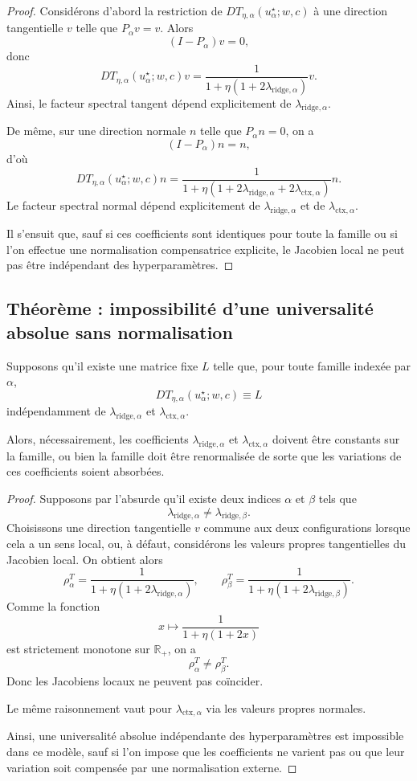 \begin{proof}
Considérons d'abord la restriction de \(DT_{\eta,\alpha}(u_\alpha^\star;w,c)\) à une direction tangentielle \(v\) telle que \(P_\alpha v=v\). Alors
\[
(I-P_\alpha)v=0,
\]
donc
\[
DT_{\eta,\alpha}(u_\alpha^\star;w,c)v
=
\frac{1}{1+\eta(1+2\lambda_{\mathrm{ridge},\alpha})}v.
\]
Ainsi, le facteur spectral tangent dépend explicitement de \(\lambda_{\mathrm{ridge},\alpha}\).

De même, sur une direction normale \(n\) telle que \(P_\alpha n=0\), on a
\[
(I-P_\alpha)n=n,
\]
d'où
\[
DT_{\eta,\alpha}(u_\alpha^\star;w,c)n
=
\frac{1}{1+\eta(1+2\lambda_{\mathrm{ridge},\alpha}+2\lambda_{\mathrm{ctx},\alpha})}n.
\]
Le facteur spectral normal dépend explicitement de \(\lambda_{\mathrm{ridge},\alpha}\) et de \(\lambda_{\mathrm{ctx},\alpha}\).

Il s'ensuit que, sauf si ces coefficients sont identiques pour toute la famille ou si l'on effectue une normalisation compensatrice explicite, le Jacobien local ne peut pas être indépendant des hyperparamètres.
\end{proof}

\subsection{Théorème : impossibilité d'une universalité absolue sans normalisation}

Supposons qu'il existe une matrice fixe \(L\) telle que, pour toute famille indexée par \(\alpha\),
\[
DT_{\eta,\alpha}(u_\alpha^\star;w,c)\equiv L
\]
indépendamment de \(\lambda_{\mathrm{ridge},\alpha}\) et \(\lambda_{\mathrm{ctx},\alpha}\).

Alors, nécessairement, les coefficients \(\lambda_{\mathrm{ridge},\alpha}\) et \(\lambda_{\mathrm{ctx},\alpha}\) doivent être constants sur la famille, ou bien la famille doit être renormalisée de sorte que les variations de ces coefficients soient absorbées.

\begin{proof}
Supposons par l'absurde qu'il existe deux indices \(\alpha\) et \(\beta\) tels que
\[
\lambda_{\mathrm{ridge},\alpha}\neq \lambda_{\mathrm{ridge},\beta}.
\]
Choisissons une direction tangentielle \(v\) commune aux deux configurations lorsque cela a un sens local, ou, à défaut, considérons les valeurs propres tangentielles du Jacobien local. On obtient alors
\[
\rho_{\alpha}^{T}
=
\frac{1}{1+\eta(1+2\lambda_{\mathrm{ridge},\alpha})},
\qquad
\rho_{\beta}^{T}
=
\frac{1}{1+\eta(1+2\lambda_{\mathrm{ridge},\beta})}.
\]
Comme la fonction
\[
x\mapsto \frac{1}{1+\eta(1+2x)}
\]
est strictement monotone sur \(\mathbb R_+\), on a
\[
\rho_{\alpha}^{T}\neq \rho_{\beta}^{T}.
\]
Donc les Jacobiens locaux ne peuvent pas coïncider.

Le même raisonnement vaut pour \(\lambda_{\mathrm{ctx},\alpha}\) via les valeurs propres normales.

Ainsi, une universalité absolue indépendante des hyperparamètres est impossible dans ce modèle, sauf si l'on impose que les coefficients ne varient pas ou que leur variation soit compensée par une normalisation externe.
\end{proof}

